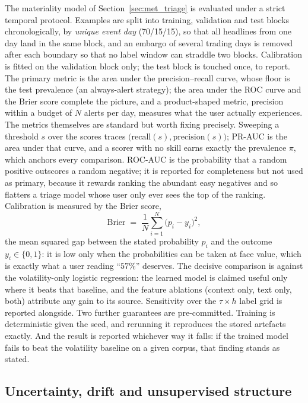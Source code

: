 The materiality model of Section~\ref{sec:met_triage} is evaluated under a strict temporal protocol.
Examples are split into training, validation and test blocks chronologically, by \emph{unique event day}
(70/15/15), so that all headlines from one day land in the same block, and an embargo of several trading
days is removed after each boundary so that no label window can straddle two blocks. Calibration is
fitted on the validation block only; the test block is touched once, to report. The primary metric is
the area under the precision--recall curve, whose floor is the test prevalence (an always-alert
strategy); the area under the ROC curve and the Brier score complete the picture, and a product-shaped
metric, precision within a budget of $N$ alerts per day, measures what the user actually experiences.
The metrics themselves are standard but worth fixing precisely. Sweeping a threshold $s$ over the
scores traces $\big(\mathrm{recall}(s), \mathrm{precision}(s)\big)$; PR-AUC is the area under that
curve, and a scorer with no skill earns exactly the prevalence $\pi$, which anchors every comparison.
ROC-AUC is the probability that a random positive outscores a random negative; it is reported for
completeness but not used as primary, because it rewards ranking the abundant easy negatives and so
flatters a triage model whose user only ever sees the top of the ranking. Calibration is measured by
the Brier score,
\begin{equation}
\mathrm{Brier} \;=\; \frac{1}{N}\sum_{i=1}^{N}\big(p_i - y_i\big)^2 ,
\label{eq:brier}
\end{equation}
the mean squared gap between the stated probability $p_i$ and the outcome $y_i \in \{0,1\}$: it is low
only when the probabilities can be taken at face value, which is exactly what a user reading ``$57\%$''
deserves.
The decisive comparison is against the volatility-only logistic regression: the learned model is claimed
useful only where it beats that baseline, and the feature ablations (context only, text only, both)
attribute any gain to its source. Sensitivity over the $\tau \times h$ label grid is reported alongside.
Two further guarantees are pre-committed. Training is deterministic given the seed, and rerunning it
reproduces the stored artefacts exactly. And the result is reported whichever way it falls: if the
trained model fails to beat the volatility baseline on a given corpus, that finding stands as stated.

\subsection{Uncertainty, drift and unsupervised structure}
\label{sec:met_eval_uncertainty}


